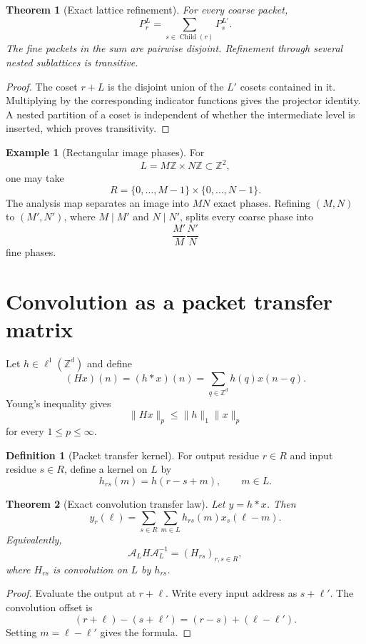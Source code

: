 \documentclass{aomart}
\newtheorem{theorem}{Theorem}[section]
\theoremstyle{definition}
\newtheorem{definition}[definition]{Definition}
\newtheorem{example}[example]{Example}
\theoremstyle{remark}
\newcommand{\ZZ}{\mathbb Z}
\newcommand{\Acal}{\mathcal A}
\begin{document}
\begin{theorem}[Exact lattice refinement]\label{thm:lattice_refinement}
For every coarse packet,
\[
P_r^{L}
=
\sum_{s\in\operatorname{Child}(r)}P_s^{L'}.
\]
The fine packets in the sum are pairwise disjoint. Refinement through several nested sublattices is transitive.
\end{theorem}

\begin{proof}
The coset \(r+L\) is the disjoint union of the \(L'\) cosets contained in it. Multiplying by the corresponding indicator functions gives the projector identity. A nested partition of a coset is independent of whether the intermediate level is inserted, which proves transitivity.
\end{proof}

\begin{example}[Rectangular image phases]\label{ex:image_phases}
For
\[
L=M\ZZ\times N\ZZ\subset\ZZ^2,
\]
one may take
\[
R=\{0,\ldots,M-1\}\times\{0,\ldots,N-1\}.
\]
The analysis map separates an image into \(MN\) exact phases. Refining \((M,N)\) to \((M',N')\), where \(M\mid M'\) and \(N\mid N'\), splits every coarse phase into
\[
\frac{M'}M\frac{N'}N
\]
fine phases.
\end{example}

\section{Convolution as a packet transfer matrix}\label{sec:convolution}

Let \(h\in\ell^1(\ZZ^d)\) and define
\[
(Hx)(n)
=(h*x)(n)
=\sum_{q\in\ZZ^d}h(q)x(n-q).
\]
Young's inequality gives
\[
\|Hx\|_p\leq\|h\|_1\|x\|_p
\]
for every \(1\leq p\leq\infty\).

\begin{definition}[Packet transfer kernel]\label{def:packet_transfer_kernel}
For output residue \(r\in R\) and input residue \(s\in R\), define a kernel on \(L\) by
\[
h_{rs}(m)=h(r-s+m),
\qquad
m\in L.
\]
\end{definition}

\begin{theorem}[Exact convolution transfer law]\label{thm:convolution_transfer}
Let \(y=h*x\). Then
\[
y_r(\ell)
=
\sum_{s\in R}\sum_{m\in L}h_{rs}(m)x_s(\ell-m).
\]
Equivalently,
\[
\Acal_LH\Acal_L^{-1}
=
(H_{rs})_{r,s\in R},
\]
where \(H_{rs}\) is convolution on \(L\) by \(h_{rs}\).
\end{theorem}

\begin{proof}
Evaluate the output at \(r+\ell\). Write every input address as \(s+\ell'\). The convolution offset is
\[
(r+\ell)-(s+\ell')
=(r-s)+(\ell-\ell').
\]
Setting \(m=\ell-\ell'\) gives the formula.
\end{proof}
\end{document}

